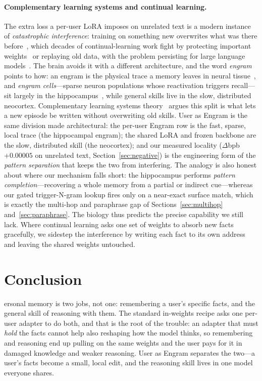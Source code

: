 \documentclass[letterpaper]{article} %
\begin{document}
\paragraph{Complementary learning systems and continual learning.}
The extra loss a per-user LoRA imposes on unrelated text is a modern
instance of \emph{catastrophic interference}: training on
something new overwrites what was there
before~\citep{mccloskey1989catastrophic}, which decades of
continual-learning work fight by protecting important
weights~\citep{kirkpatrick2017ewc} or replaying old data, with
the problem persisting for large language
models~\citep{shi2024continual}. The brain avoids it with a
different architecture, and the word \emph{engram} points to how:
an engram is the physical trace a memory leaves in neural
tissue~\citep{semon1921mneme}, and \emph{engram cells}---sparse
neuron populations whose reactivation triggers recall---sit
largely in the hippocampus~\citep{tonegawa2015engram}, while
general skills live in the slow, distributed neocortex.
Complementary learning systems
theory~\citep{mcclelland1995cls,kumaran2016cls} argues this split
is what lets a new episode be written without overwriting old
skills. User as Engram is the same division made architectural:
the per-user Engram row is the fast, sparse, local trace (the
hippocampal engram); the shared LoRA and frozen backbone are the
slow, distributed skill (the neocortex); and our measured locality
($\Delta$bpb $+0.00005$ on unrelated text,
Section~\ref{sec:negative}) is the engineering form of the
\emph{pattern separation} that keeps the two from interfering. The
analogy is also honest about where our mechanism falls short: the
hippocampus performs \emph{pattern completion}---recovering a whole
memory from a partial or indirect cue---whereas our gated
trigger-N-gram lookup fires only on a near-exact surface match, which
is exactly the multi-hop and paraphrase gap of
Sections~\ref{sec:multihop} and~\ref{sec:paraphrase}. The biology
thus predicts the precise capability we still lack. Where
continual learning asks one set of weights to absorb new facts
gracefully, we sidestep the interference by writing each fact to
its own address and leaving the shared weights untouched.

\section{Conclusion}
\label{sec:conclusion}

ersonal memory is two jobs, not one: remembering a
user's specific facts, and the general skill of reasoning with
them. The standard in-weights recipe asks one per-user adapter to
do both, and that is the root of the trouble: an adapter that must
\emph{hold} the facts cannot help also reshaping how the model
thinks, so remembering and reasoning end up pulling on the same
weights and the user pays for it in damaged knowledge and weaker
reasoning. User as Engram separates the two---a user's facts
become a small, local edit, and the reasoning skill lives in one
model everyone shares.
\end{document}
